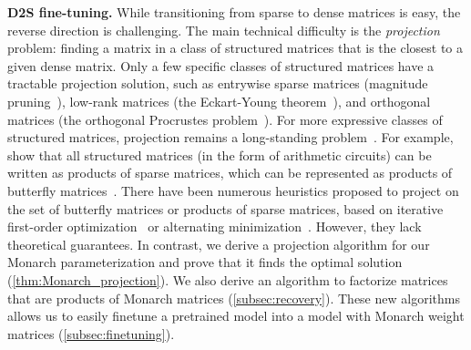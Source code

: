\textbf{D2S fine-tuning.}
While transitioning from sparse to dense matrices is easy, the reverse direction is challenging.
The main technical difficulty is the \emph{projection} problem: finding a matrix in a class of structured matrices that is the closest to a given dense matrix.
Only a few specific classes of structured matrices have a tractable projection solution, such as entrywise sparse matrices (magnitude pruning~\citep{tewarson1973sparse}), low-rank matrices (the Eckart-Young theorem~\citep{eckart1936approximation}), and orthogonal matrices (the orthogonal Procrustes problem~\citep{schonemann1966generalized}).
For more expressive classes of structured matrices, projection remains a long-standing problem~\citep{pan2012structured}.
For example, \citet{desa2018two} show that all structured matrices (in the form of arithmetic circuits) can be written as products of sparse matrices, which can be represented as products of butterfly matrices~\citep{dao2020kaleidoscope}.
There have been numerous heuristics proposed to project on the set of butterfly matrices or products of sparse matrices, based on iterative first-order optimization~\citep{le2016flexible, dao2019learning, khalitov2021sparse} or alternating minimization~\citep{lin2021deformable}.
However, they lack theoretical guarantees.
In contrast, we derive a projection algorithm for our Monarch parameterization and prove that it finds the optimal solution (\cref{thm:Monarch_projection}).
We also derive an algorithm to factorize matrices that are products of Monarch matrices (\cref{subsec:recovery}). These new algorithms allows us to easily finetune a pretrained model into a model with Monarch weight matrices (\cref{subsec:finetuning}).







